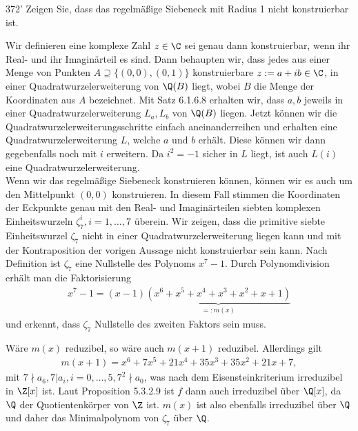 \begin{algebraUE}{372'}
Zeigen Sie, dass das regelmäßige Siebeneck mit Radius 1 nicht konstruierbar ist.
\end{algebraUE}

\begin{solution}
  Wir definieren eine komplexe Zahl $z \in \C$ sei genau dann konstruierbar, wenn ihr
  Real- und ihr Imaginärteil es sind. Dann behaupten wir, dass jedes
  aus einer Menge von Punkten $A \supseteq \{(0,0),(0,1)\}$ konstruierbare $z := a + ib \in \C$,
  in einer Quadratwurzelerweiterung von $\Q(B)$ liegt, wobei
  $B$ die Menge der Koordinaten aus $A$ bezeichnet.
  Mit Satz 6.1.6.8 erhalten wir, dass $a,b$ jeweils in einer Quadratwurzelerweiterung $L_a,L_b$ von $\Q(B)$ liegen.
  Jetzt können wir die Quadratwurzelerweiterungsschritte einfach aneinanderreihen
  und erhalten eine Quadratwurzelerweiterung $L$, welche $a$ und $b$ erhält.
  Diese können wir dann gegebenfalls noch mit $i$ erweitern. Da $i^2 = -1$
  sicher in $L$ liegt, ist auch $L(i)$ eine Quadratwurzelerweiterung. \\
  Wenn wir das regelmäßige Siebeneck konstruieren können, können wir es auch um
  den Mittelpunkt $(0,0)$ konstruieren. In diesem Fall stimmen die Koordinaten der Eckpunkte genau
  mit den Real- und Imaginärteilen siebten komplexen Einheitswurzeln $\zeta_7^i, i = 1,\dots,7$ überein.
  Wir zeigen, dass die primitive siebte Einheitswurzel $\zeta_7$ nicht in einer
  Quadratwurzelerweiterung liegen kann und mit der Kontraposition der vorigen Aussage
  nicht konstruierbar sein kann. Nach Definition ist $\zeta_7$ eine Nullstelle des Polynoms $x^7-1.$ Durch Polynomdivision erhält man die Faktorisierung
  \begin{align}
      x^7-1 = (x-1)\underbrace{(x^6+x^5+x^4+x^3+x^2+x+1)}_{=: m(x)}
  \end{align}
  und erkennt, dass $\zeta_7$ Nullstelle des zweiten Faktors sein muss.

  Wäre $m(x)$ reduzibel, so wäre auch $m(x+1)$ reduzibel. Allerdings gilt
  \begin{align}
      m(x+1) = x^6+7x^5+21x^4+35x^3+35x^2+21x+7,
  \end{align}
  mit $7\nmid a_6, 7 | a_i, i = 0,\dots,5, 7^2 \nmid a_0$,
  was nach dem Eisensteinkriterium irreduzibel in $\Z[x]$ ist.
  Laut Proposition 5.3.2.9 ist $f$ dann auch irreduzibel über $\Q[x]$, da
  $\Q$ der Quotientenkörper von $\Z$ ist.
  $m(x)$ ist also ebenfalls irreduzibel über $\Q$ und daher das Minimalpolynom von $\zeta_7$ über $\Q$. 


\end{solution}
